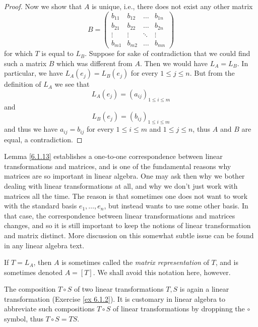 \begin{proof}
    Now we show that \(A\) is unique, i.e., there does not exist any other matrix
    \[
        B = \begin{pmatrix}
            b_{11} & b_{12} & \dots  & b_{1n} \\
            b_{21} & b_{22} & \dots  & b_{2n} \\
            \vdots & \vdots & \ddots & \vdots \\
            b_{m1} & b_{m2} & \dots  & b_{mn}
        \end{pmatrix}
    \]
    for which \(T\) is equal to \(L_B\).
    Suppose for sake of contradiction that we could find such a matrix \(B\) which was different from \(A\).
    Then we would have \(L_A = L_B\).
    In particular, we have \(L_A(e_j) = L_B(e_j)\) for every \(1 \leq j \leq n\).
    But from the definition of \(L_A\) we see that
    \[
        L_A(e_j) = (a_{ij})_{1 \leq i \leq m}
    \]
    and
    \[
        L_B(e_j) = (b_{ij})_{1 \leq i \leq m}
    \]
    and thus we have \(a_{ij} = b_{ij}\) for every \(1 \leq i \leq m\) and \(1 \leq j \leq n\), thus \(A\) and \(B\) are equal, a contradiction.
\end{proof}

\begin{remark}\label{6.1.14}
    Lemma \ref{6.1.13} establishes a one-to-one correspondence between linear transformations and matrices, and is one of the fundamental reasons why matrices are so important in linear algebra.
    One may ask then why we bother dealing with linear transformations at all, and why we don't just work with matrices all the time.
    The reason is that sometimes one does not want to work with the standard basis \(e_1, \dots, e_n\), but instead wants to use some other basis.
    In that case, the correspondence between linear transformations and matrices changes, and so it is still important to keep the notions of linear transformation and matrix distinct.
    More discussion on this somewhat subtle issue can be found in any linear algebra text.
\end{remark}

\begin{remark}\label{6.1.15}
    If \(T = L_A\), then \(A\) is sometimes called the \emph{matrix representation} of \(T\), and is sometimes denoted \(A = [T]\).
    We shall avoid this notation here, however.
\end{remark}

\begin{note}
    The composition \(T \circ S\) of two linear transformations \(T, S\) is again a linear transformation (Exercise \ref{ex 6.1.2}).
    It is customary in linear algebra to abbreviate such compositions \(T \circ S\) of linear transformations by droppinng the \(\circ\) symbol, thus \(T \circ S = TS\).
\end{note}

